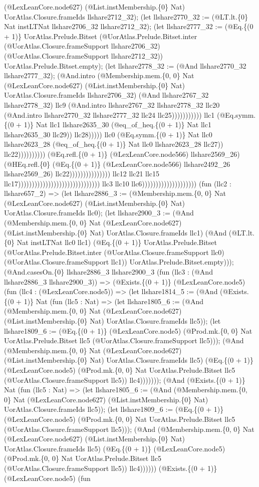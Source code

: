\documentclass[11pt]{article}
\begin{document}
(@LexLeanCore.node627) (@List.instMembership.\{0\} Nat) UorAtlas.Closure.frameIds llshare2712\_32); (let llshare2770\_32 := (@LT.lt.\{0\} Nat instLTNat llshare2706\_32 llshare2712\_32); (let llshare2777\_32 := (@Eq.\{(0 + 1)\} UorAtlas.Prelude.Bitset (@UorAtlas.Prelude.Bitset.inter (@UorAtlas.Closure.frameSupport llshare2706\_32) (@UorAtlas.Closure.frameSupport llshare2712\_32)) UorAtlas.Prelude.Bitset.empty); (let llshare2778\_32 := (@And llshare2770\_32 llshare2777\_32); (@And.intro (@Membership.mem.\{0, 0\} Nat (@LexLeanCore.node627) (@List.instMembership.\{0\} Nat) UorAtlas.Closure.frameIds llshare2706\_32) (@And llshare2767\_32 llshare2778\_32) llc9 (@And.intro llshare2767\_32 llshare2778\_32 llc20 (@And.intro llshare2770\_32 llshare2777\_32 llc24 llc25))))))))))) llc1 (@Eq.symm.\{(0 + 1)\} Nat llc1 llshare2635\_30 (@eq\_of\_heq.\{(0 + 1)\} Nat llc1 llshare2635\_30 llc29)) llc28))))) llc0 (@Eq.symm.\{(0 + 1)\} Nat llc0 llshare2623\_28 (@eq\_of\_heq.\{(0 + 1)\} Nat llc0 llshare2623\_28 llc27)) llc22)))))))))) (@Eq.refl.\{(0 + 1)\} (@LexLeanCore.node566) llshare2569\_26) (@HEq.refl.\{0\} (@Eq.\{(0 + 1)\} (@LexLeanCore.node566) llshare2492\_26 llshare2569\_26) llc22))))))))))))))) llc12 llc21 llc15 llc17)))))))))))))))))))))))))))))) llc3 llc10 llc6)))))))))))))))))))) (fun (llc2 : llshare657\_2) => (let llshare2886\_3 := (@Membership.mem.\{0, 0\} Nat (@LexLeanCore.node627) (@List.instMembership.\{0\} Nat) UorAtlas.Closure.frameIds llc0); (let llshare2900\_3 := (@And (@Membership.mem.\{0, 0\} Nat (@LexLeanCore.node627) (@List.instMembership.\{0\} Nat) UorAtlas.Closure.frameIds llc1) (@And (@LT.lt.\{0\} Nat instLTNat llc0 llc1) (@Eq.\{(0 + 1)\} UorAtlas.Prelude.Bitset (@UorAtlas.Prelude.Bitset.inter (@UorAtlas.Closure.frameSupport llc0) (@UorAtlas.Closure.frameSupport llc1)) UorAtlas.Prelude.Bitset.empty))); (@And.casesOn.\{0\} llshare2886\_3 llshare2900\_3 (fun (llc3 : (@And llshare2886\_3 llshare2900\_3)) => (@Exists.\{(0 + 1)\} (@LexLeanCore.node5) (fun (llc4 : (@LexLeanCore.node5)) => (let llshare1814\_5 := (@And (@Exists.\{(0 + 1)\} Nat (fun (llc5 : Nat) => (let llshare1805\_6 := (@And (@Membership.mem.\{0, 0\} Nat (@LexLeanCore.node627) (@List.instMembership.\{0\} Nat) UorAtlas.Closure.frameIds llc5)); (let llshare1809\_6 := (@Eq.\{(0 + 1)\} (@LexLeanCore.node5) (@Prod.mk.\{0, 0\} Nat UorAtlas.Prelude.Bitset llc5 (@UorAtlas.Closure.frameSupport llc5))); (@And (@Membership.mem.\{0, 0\} Nat (@LexLeanCore.node627) (@List.instMembership.\{0\} Nat) UorAtlas.Closure.frameIds llc5) (@Eq.\{(0 + 1)\} (@LexLeanCore.node5) (@Prod.mk.\{0, 0\} Nat UorAtlas.Prelude.Bitset llc5 (@UorAtlas.Closure.frameSupport llc5)) llc4))))))); (@And (@Exists.\{(0 + 1)\} Nat (fun (llc5 : Nat) => (let llshare1805\_6 := (@And (@Membership.mem.\{0, 0\} Nat (@LexLeanCore.node627) (@List.instMembership.\{0\} Nat) UorAtlas.Closure.frameIds llc5)); (let llshare1809\_6 := (@Eq.\{(0 + 1)\} (@LexLeanCore.node5) (@Prod.mk.\{0, 0\} Nat UorAtlas.Prelude.Bitset llc5 (@UorAtlas.Closure.frameSupport llc5))); (@And (@Membership.mem.\{0, 0\} Nat (@LexLeanCore.node627) (@List.instMembership.\{0\} Nat) UorAtlas.Closure.frameIds llc5) (@Eq.\{(0 + 1)\} (@LexLeanCore.node5) (@Prod.mk.\{0, 0\} Nat UorAtlas.Prelude.Bitset llc5 (@UorAtlas.Closure.frameSupport llc5)) llc4)))))) (@Exists.\{(0 + 1)\} (@LexLeanCore.node5) (fun 
\end{document}

